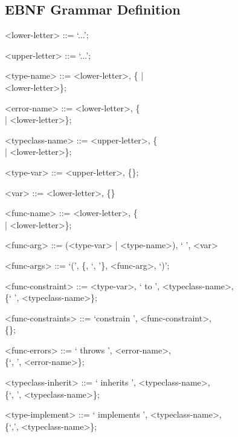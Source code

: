 \documentclass{acm_proc_article-sp}
\begin{document}
\begin{appendices}
    \section{EBNF Grammar Definition}
        \label{app:Grammar}
            \begin{grammar}

            <lower-letter> ::= `...';

            <upper-letter> ::= `...';

            <type-name> ::= <lower-letter>, \{<upper-letter> |
            \\ <lower-letter>\};

            <error-name> ::= <lower-letter>, \{<upper-letter>
            \\ | <lower-letter>\};

            <typeclass-name> ::= <upper-letter>, \{<upper-letter>
            \\ | <lower-letter>\};

            <type-var> ::= <upper-letter>, \{<upper-letter>\};

            <var> ::= <lower-letter>, \{<lower-letter>\}

            <func-name> ::= <lower-letter>, \{<upper-letter>
            \\ | <lower-letter>\};

            <func-arg> ::= (<type-var> | <type-name>), ` ', <var>

            <func-args> ::= `(', \{<func-arg>, `, '\}, <func-arg>, `)';

            <func-constraint> ::= <type-var>, ` to ', <typeclass-name>,
            \\ \{` ', <typeclass-name>\};

            <func-constraints> ::= `constrain ', <func-constraint>,
            \\ \{<func-constraint>\};

            <func-errors> ::= ` throws ', <error-name>,
            \\ \{`, ', <error-name>\};

            <typeclass-inherit> ::= ` inherits ', <typeclass-name>,
            \\ \{`, ', <typeclass-name>\};

            <type-implement> ::= ` implements ', <typeclass-name>,
             \\\{`,', <typeclass-name>\};


\end{grammar}
\end{appendices}
\end{document}
